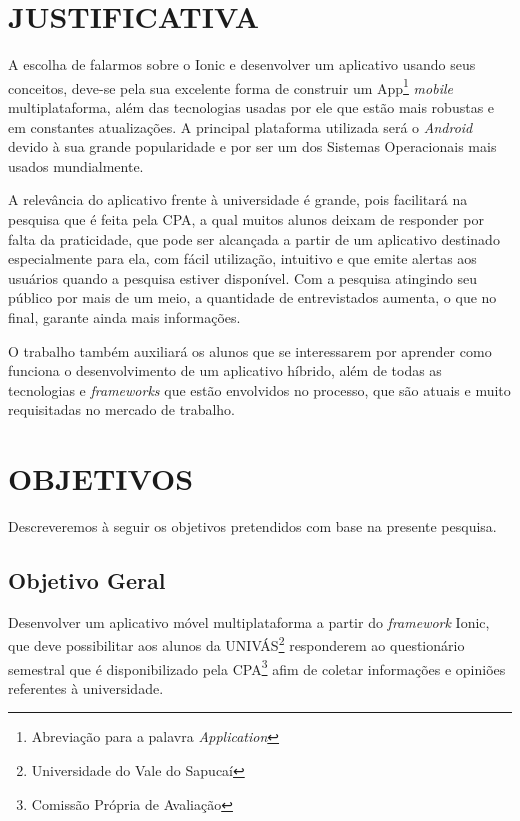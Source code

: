 \chapter{JUSTIFICATIVA}

	\par A escolha de falarmos sobre o Ionic e desenvolver um aplicativo usando seus conceitos, deve-se pela sua excelente forma de construir um App\footnote{Abreviação para a palavra \textit{Application}} \textit{mobile} multiplataforma, além das tecnologias usadas por ele que estão mais robustas e em constantes atualizações. A principal plataforma utilizada será o \textit{Android} devido à sua grande popularidade e por ser um dos Sistemas Operacionais mais usados mundialmente.
	
	\par A relevância do aplicativo frente à universidade é grande, pois facilitará na pesquisa que é feita pela CPA, a qual muitos alunos deixam de responder por falta da praticidade, que pode ser alcançada a partir de um aplicativo destinado especialmente para ela, com fácil utilização, intuitivo e que emite alertas aos usuários quando a pesquisa estiver disponível. Com a pesquisa atingindo seu público por mais de um meio, a quantidade de entrevistados aumenta, o que no final, garante ainda mais informações.
	
	\par O trabalho também auxiliará os alunos que se interessarem por aprender como funciona o desenvolvimento de um aplicativo híbrido, além de todas as tecnologias e \textit{frameworks} que estão envolvidos no processo, que são atuais e muito requisitadas no mercado de trabalho.
	

\chapter{OBJETIVOS}

	\par Descreveremos à seguir os objetivos pretendidos com base na presente pesquisa.

\section{Objetivo Geral}

	\par Desenvolver um aplicativo móvel multiplataforma a partir do \textit{framework} Ionic, que deve possibilitar aos alunos da UNIVÁS\footnote{Universidade do Vale do Sapucaí} responderem ao questionário semestral que é disponibilizado pela CPA\footnote{Comissão Própria de Avaliação} afim de coletar informações e opiniões referentes à universidade.

